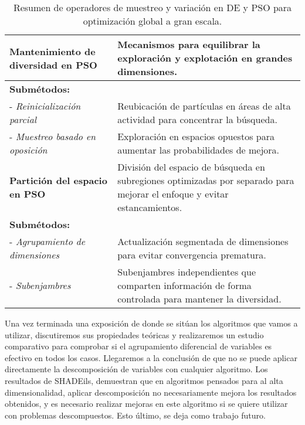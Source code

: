 \begin{table}[H]
{\begin{tabular}{|l|p{12cm}|}
\textbf{Mantenimiento de diversidad en PSO} & Mecanismos para equilibrar la exploración y explotación en grandes dimensiones. \\ \hline
\multicolumn{2}{|l|}{\textbf{Submétodos:}} \\ \hline
- \textit{Reinicialización parcial} & Reubicación de partículas en áreas de alta actividad para concentrar la búsqueda. \\ \hline
- \textit{Muestreo basado en oposición} & Exploración en espacios opuestos para aumentar las probabilidades de mejora. \\ \hline

\textbf{Partición del espacio en PSO} & División del espacio de búsqueda en subregiones optimizadas por separado para mejorar el enfoque y evitar estancamientos. \\ \hline
\multicolumn{2}{|l|}{\textbf{Submétodos:}} \\ \hline
- \textit{Agrupamiento de dimensiones} & Actualización segmentada de dimensiones para evitar convergencia prematura. \\ \hline
- \textit{Subenjambres} & Subenjambres independientes que comparten información de forma controlada para mantener la diversidad. \\ \hline

\end{tabular}%
}
\caption{Resumen de operadores de muestreo y variación en DE y PSO para optimización global a gran escala.}
\label{tab:sampling_variation}
\end{table}

Una vez terminada una exposición de donde se sitúan los algoritmos que vamos a utilizar, discutiremos sus propiedades teóricas y realizaremos un estudio comparativo para comprobar si el agrupamiento diferencial de variables es efectivo en todos los casos. Llegaremos a la conclusión de que no se puede aplicar directamente la descomposición de variables con cualquier algoritmo. Los resultados de SHADEils, demuestran que en algoritmos pensados para al alta dimensionalidad, aplicar descomposición no necesariamente mejora los resultados obtenidos, y es necesario realizar mejoras en este algoritmo si se quiere utilizar con problemas descompuestos. Esto último, se deja como trabajo futuro.

\endinput
